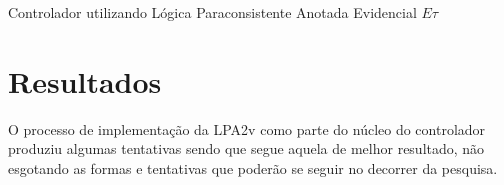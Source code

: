 Controlador utilizando Lógica Paraconsistente Anotada Evidencial $E\tau$



\section{Resultados}

O processo de implementação da LPA2v como parte do núcleo do controlador 
produziu algumas tentativas sendo que segue aquela de melhor resultado, 
não esgotando as formas e tentativas que poderão se seguir 
no decorrer da pesquisa.

